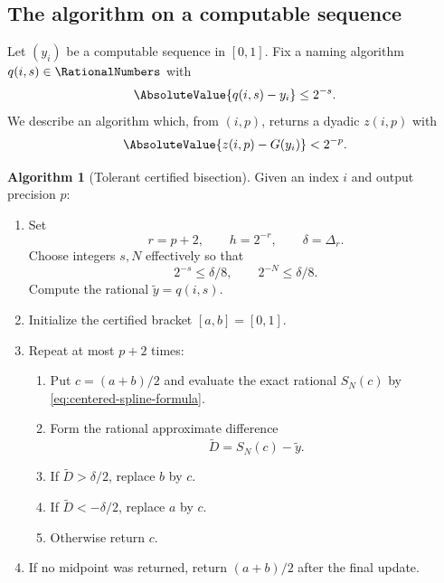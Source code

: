 \documentclass[11pt,oneside]{article}
\theoremstyle{definition}
\newtheorem{algorithm}[theorem]{Algorithm}
\theoremstyle{remark}
\numberwithin{equation}{section}
\begin{document}
\subsection{The algorithm on a computable sequence}

Let $(y_i)$ be a computable sequence in $[0,1]$.  Fix a naming algorithm
$q(i,s)\in\RationalNumbers$ with
\begin{equation}\label{eq:input-name}
 \AbsoluteValue{q(i,s)-y_i}\le2^{-s}.
\end{equation}
We describe an algorithm which, from $(i,p)$, returns a dyadic $z(i,p)$ with
\begin{equation}\label{eq:output-name-goal}
 \AbsoluteValue{z(i,p)-G(y_i)}<2^{-p}.
\end{equation}

\begin{algorithm}[Tolerant certified bisection]\label{alg:tolerant-bisection}
Given an index $i$ and output precision $p$:
\begin{enumerate}
\item Set
\[
 r=p+2,
 \qquad h=2^{-r},
 \qquad \delta=\Delta_r.
\]
Choose integers $s,N$ effectively so that
\begin{equation}\label{eq:oracle-precisions}
 2^{-s}\le\delta/8,
 \qquad 2^{-N}\le\delta/8.
\end{equation}
Compute the rational $\widetilde y=q(i,s)$.
\item Initialize the certified bracket $[a,b]=[0,1]$.
\item Repeat at most $p+2$ times:
  \begin{enumerate}
  \item Put $c=(a+b)/2$ and evaluate the exact rational $S_N(c)$ by
        \eqref{eq:centered-spline-formula}.
  \item Form the rational approximate difference
        \begin{equation}\label{eq:D-tilde}
         \widetilde D=S_N(c)-\widetilde y.
        \end{equation}
  \item If $\widetilde D>\delta/2$, replace $b$ by $c$.
  \item If $\widetilde D<-\delta/2$, replace $a$ by $c$.
  \item Otherwise return $c$.
  \end{enumerate}
\item If no midpoint was returned, return $(a+b)/2$ after the final update.
\end{enumerate}
\end{algorithm}
\end{document}
